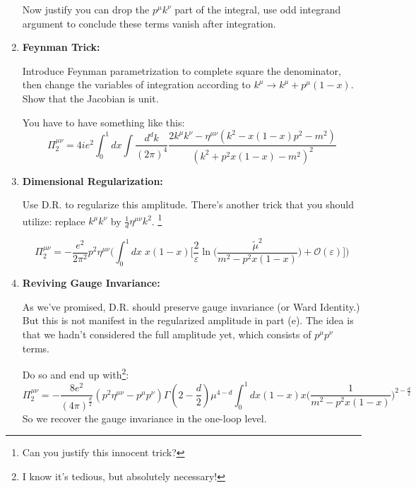 \documentclass[11pt]{article}
\begin{document}
\begin{enumerate}
\begin{problem}{\points{-}}
	Now justify you can drop the $p^\mu k^\nu$ part of the integral, use odd integrand argument to conclude these terms vanish after integration.
	
\end{problem}
\item
\begin{problem}{\points{-}}
	\textbf{Feynman Trick:}
	
	Introduce Feynman parametrization to complete square the denominator, then change the variables of integration according to $k^\mu \to k^\mu + p^\mu (1-x)$. Show that the Jacobian is unit.
	
	You have to have something like this:
	\[
	\Pi^{\mu\nu}_2 = 4ie^2 \int_0^1 dx\int \frac{d^dk}{(2\pi)^4} 
	\frac{
2k^\mu k^\nu - \eta^{\mu\nu}(k^2 -x(1-x) p^2 -m^2)	
}{(k^2 +p^2x(1-x) -m^2)^2}
	\]
	
\end{problem}
\item
\begin{problem}{\points{-}}
	\textbf{Dimensional Regularization:}
	
	Use D.R. to regularize this amplitude. There's another trick that you should utilize: replace $k^\mu k^\nu$ by $\frac{1}{d} \eta^{\mu\nu}k^2$. \footnote{Can you justify this innocent trick?}
	
	\[
	\Pi^{\mu\nu}_2 = -\frac{e^2}{2\pi^2}p^2\eta^{\mu\nu}\Big(
	\int_0^1 dx \; x(1-x) \Big[
	\frac{2}{\varepsilon} \ln \big(\frac{\tilde{\mu}^2}{m^2 - p^2x(1-x)}\big) +\mathcal{O}(\varepsilon)
	\Big]
	\Big)
	\]
	
\end{problem}

\item
\begin{problem}{\points{-}}
	\textbf{Reviving Gauge Invariance:}
	
	As we've promised, D.R. should preserve gauge invariance (or Ward Identity.) But this is not manifest in the regularized amplitude in part (e). The idea is that we hadn't considered the full amplitude yet, which consists of $p^\mu p^\nu$ terms.
	
	Do so and end up with\footnote{I know it's tedious, but absolutely necessary!}:
	\[
	\Pi^{\mu\nu}_2 = -\frac{8e^2}{(4\pi)^{\frac{d}{2}}} (p^2 \eta^{\mu\nu} - p^\mu p^\nu) \Gamma(2-\frac{d}{2}) \mu^{4-d} \int_0^1 dx (1-x)x \big(\frac{1}{m^2 - p^2x(1-x)}\big)^{2-\frac{d}{2}}
	\]
	So we recover the gauge invariance in the one-loop level.
\end{problem}
\end{enumerate}
\end{document}
